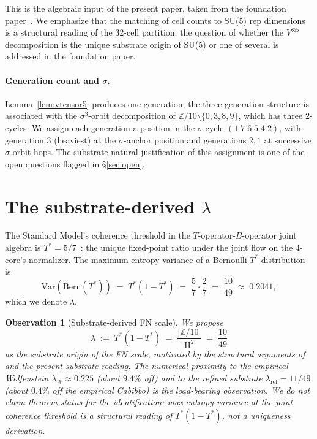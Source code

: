\documentclass[11pt,reqno]{amsart}
\theoremstyle{plain}
\newtheorem{observation}[theorem]{Observation}
\theoremstyle{definition}
\theoremstyle{remark}
\newcommand{\Z}{\mathbb{Z}}
\DeclareMathOperator{\HARM}{H}    %
\begin{document}
This is the algebraic input of the present paper, taken from
the foundation paper~\cite{SandersGish2026DiscreteDirac}. We
emphasize that the matching of cell counts to SU(5) rep
dimensions is a structural reading of the $32$-cell partition;
the question of whether the $V^{\otimes 5}$ decomposition is
the unique substrate origin of SU(5) or one of several is
addressed in the foundation paper.

\paragraph{Generation count and $\sigma$.}
Lemma~\ref{lem:vtensor5} produces one generation; the
three-generation structure is associated with the
$\sigma^{3}$-orbit decomposition of $\Z/10
\setminus\{0,3,8,9\}$, which has three $2$-cycles. We assign
each generation a position in the $\sigma$-cycle
$(1\;7\;6\;5\;4\;2)$, with generation $3$ (heaviest) at the
$\sigma$-anchor position and generations $2, 1$ at successive
$\sigma$-orbit hops. The substrate-natural justification of
this assignment is one of the open questions flagged in
\S\ref{sec:open}.

\section{The substrate-derived $\lambda$}\label{sec:lambda}

The Standard Model's coherence threshold in the
$T$-operator-$B$-operator joint algebra is
$T^{*} = 5/7$~\cite{SandersGish2026FourCore}: the unique
fixed-point ratio under the joint flow on the $4$-core's
normalizer. The maximum-entropy variance of a Bernoulli-$T^{*}$
distribution is
\[
  \mathrm{Var}(\mathrm{Bern}(T^{*}))
  \;=\; T^{*}(1 - T^{*})
  \;=\; \frac{5}{7} \cdot \frac{2}{7}
  \;=\; \frac{10}{49}
  \;\approx\; 0.2041,
\]
which we denote $\lambda$.

\begin{observation}[Substrate-derived FN scale]\label{obs:lambda}
We propose
\[
  \lambda \;:=\; T^{*}(1 - T^{*}) \;=\; \frac{|\Z/10|}{\HARM^{2}} \;=\; \frac{10}{49}
\]
as the substrate origin of the FN scale, motivated by the
structural arguments of \cite{SandersGish2026FourCore} and the
present substrate reading. The numerical proximity to the
empirical Wolfenstein $\lambda_W \approx 0.225$ (about $9.4\%$
off) and to the refined substrate $\lambda_{\mathrm{ref}} =
11/49$ (about $0.4\%$ off the empirical Cabibbo) is the
load-bearing observation. We do not claim theorem-status for
the identification; max-entropy variance at the joint
coherence threshold is a structural reading of $T^*(1-T^*)$,
not a uniqueness derivation.
\end{observation}
\end{document}
